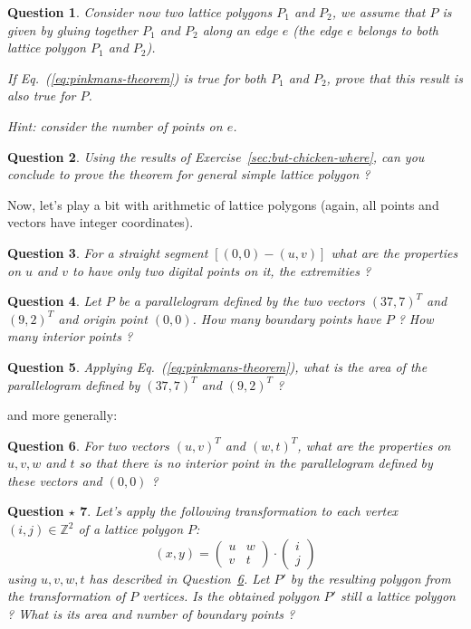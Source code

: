 \documentclass[a4paper, 11pt]{article}
\newtheorem{qu}{Question}
\newtheorem{qustar}[qu]{Question $\star$}
\begin{document}
\begin{qu}
  Consider now two lattice polygons $P_1$ and $P_2$, we assume that
  $P$ is given by gluing together $P_1$ and $P_2$ along an edge $e$ (the edge
  $e$ belongs to both lattice polygon $P_1$ and $P_2$).

  If Eq.~(\ref{eq:pinkmans-theorem}) is true for both $P_1$ and $P_2$,
  prove that this result is also true for $P$.

  Hint: consider the number of points on $e$.
\end{qu}



\begin{qu}
  Using the results of Exercise~\ref{sec:but-chicken-where}, can you
  conclude to prove the theorem for general simple lattice polygon ?
\end{qu}


Now, let's play a bit with arithmetic of lattice polygons (again, all
points and vectors have integer coordinates).

\begin{qu}
  For a straight segment $[(0,0) - (u,v)]$ what are the properties on
  $u$ and $v$ to have only two digital points on it, the extremities ?
\end{qu}


\begin{qu}
  Let $P$ be a parallelogram defined by the two vectors $(37,7)^T$ and
  $(9,2)^T$ and origin point $(0,0)$. How many boundary points have $P$
  ? How many interior points ? 
\end{qu}

\begin{qu}
  Applying Eq.~(\ref{eq:pinkmans-theorem}), what is the area of the
  parallelogram defined by $(37,7)^T$ and $(9,2)^T$ ?
\end{qu}
and more generally:
\begin{qu}
\label{questionuv}
  For two vectors $(u,v)^T$ and $(w,t)^T$, what are the properties on
  $u,v,w$ and $t$ so that there is no interior point in the
  parallelogram defined by these vectors and $(0,0)$ ?
\end{qu}



\begin{qustar}
  Let's apply the following transformation to each vertex
  $(i,j)\in\mathbb{Z}^2$ of a lattice polygon $P$:
  \begin{equation}
    (x,y) = \left (
    \begin{array}{cc}
      u & w\\
      v &t
    \end{array}\right)\cdot \left ( 
    \begin{array}{c}
      i\\j
    \end{array}\right)
  \end{equation}
using $u,v,w,t$ has described in Question~\ref{questionuv}. Let $P'$
by the resulting polygon from the transformation of $P$ vertices. Is
the obtained polygon $P'$ still a lattice polygon ? What is its area
and number of boundary points ?
\end{qustar}
\end{document}
